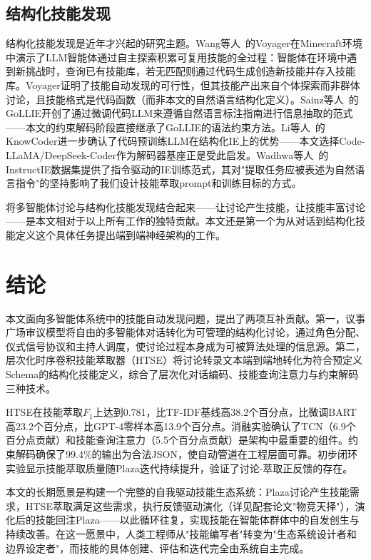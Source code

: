 \documentclass[conference]{IEEEtran}
\begin{document}
\subsection{结构化技能发现}

结构化技能发现是近年才兴起的研究主题。Wang等人~\cite{wang2023voyager}的Voyager在Minecraft环境中演示了LLM智能体通过自主探索积累可复用技能的全过程：智能体在环境中遇到新挑战时，查询已有技能库，若无匹配则通过代码生成创造新技能并存入技能库。Voyager证明了技能自动发现的可行性，但其技能产出来自个体探索而非群体讨论，且技能格式是代码函数（而非本文的自然语言结构化定义）。Sainz等人~\cite{sainz2023gollie}的GoLLIE开创了通过微调代码LLM来遵循自然语言标注指南进行信息抽取的范式——本文的约束解码阶段直接继承了GoLLIE的语法约束方法。Li等人~\cite{li2024knowcoder}的KnowCoder进一步确认了代码预训练LLM在结构化IE上的优势——本文选择Code-LLaMA/DeepSeek-Coder作为解码器基座正是受此启发。Wadhwa等人~\cite{wadhwa2023instructie}的InstructIE数据集提供了指令驱动的IE训练范式，其对"提取任务应被表述为自然语言指令"的坚持影响了我们设计技能萃取prompt和训练目标的方式。

将多智能体讨论与结构化技能发现结合起来——让讨论产生技能，让技能丰富讨论——是本文相对于以上所有工作的独特贡献。本文还是第一个为从对话到结构化技能定义这个具体任务提出端到端神经架构的工作。

\section{结论}

本文面向多智能体系统中的技能自动发现问题，提出了两项互补贡献。第一，议事广场审议模型将自由的多智能体对话转化为可管理的结构化讨论，通过角色分配、仪式信号协议和主持人调度，使讨论过程本身成为可被算法处理的信息源。第二，层次化时序卷积技能萃取器（HTSE）将讨论转录文本端到端地转化为符合预定义Schema的结构化技能定义，综合了层次化对话编码、技能查询注意力与约束解码三种技术。

HTSE在技能萃取$F_1$上达到0.781，比TF-IDF基线高38.2个百分点，比微调BART高23.2个百分点，比GPT-4零样本高13.9个百分点。消融实验确认了TCN（6.9个百分点贡献）和技能查询注意力（5.5个百分点贡献）是架构中最重要的组件。约束解码确保了99.4\%的输出为合法JSON，使自动管道在工程层面可靠。初步闭环实验显示技能萃取质量随Plaza迭代持续提升，验证了讨论-萃取正反馈的存在。

本文的长期愿景是构建一个完整的自我驱动技能生态系统：Plaza讨论产生技能需求，HTSE萃取满足这些需求，执行反馈驱动演化（详见配套论文"物竞天择"），演化后的技能回注Plaza——以此循环往复，实现技能在智能体群体中的自发创生与持续改善。在这一愿景中，人类工程师从"技能编写者"转变为"生态系统设计者和边界设定者"，而技能的具体创建、评估和迭代完全由系统自主完成。
\end{document}
